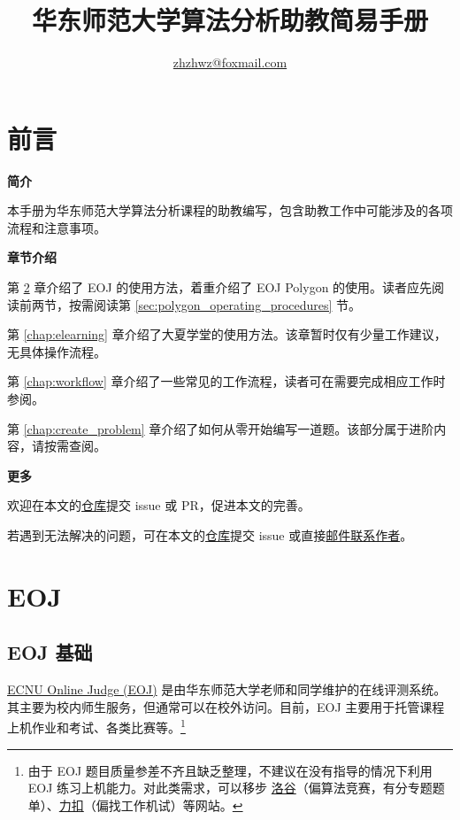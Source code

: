 \documentclass[oneside]{book}
\title{华东师范大学算法分析助教简易手册}
\author{\href{mailto:zhzhwz@foxmail.com}{zhzhwz@foxmail.com}}
\begin{document}
\frontmatter

\maketitle

\chapter{前言}

\noindent \textbf{简介}

本手册为华东师范大学算法分析课程的助教编写，包含助教工作中可能涉及的各项流程和注意事项。

\bigbreak

\noindent \textbf{章节介绍}

第 \ref{chap:eoj} 章介绍了 EOJ 的使用方法，着重介绍了 EOJ Polygon 的使用。读者应先阅读前两节，按需阅读第 \ref{sec:polygon_operating_procedures} 节。

第 \ref{chap:elearning} 章介绍了大夏学堂的使用方法。该章暂时仅有少量工作建议，无具体操作流程。

第 \ref{chap:workflow} 章介绍了一些常见的工作流程，读者可在需要完成相应工作时参阅。

第 \ref{chap:create_problem} 章介绍了如何从零开始编写一道题。该部分属于进阶内容，请按需查阅。

\bigbreak

\noindent \textbf{更多}

欢迎在本文的\href{https://github.com/zhzhwz/AlgorithmTAManual}{仓库}提交 issue 或 PR，促进本文的完善。

若遇到无法解决的问题，可在本文的\href{https://github.com/zhzhwz/AlgorithmTAManual}{仓库}提交 issue 或直接\href{mailto:zhzhwz@foxmail.com}{邮件联系作者}。 

\tableofcontents

\mainmatter

\chapter{EOJ}

\label{chap:eoj}

\section{EOJ 基础}

\label{sec:eoj_basics}

\href{https://acm.ecnu.edu.cn/}{ECNU Online Judge (EOJ)} 是由华东师范大学老师和同学维护的在线评测系统。其主要为校内师生服务，但通常可以在校外访问。目前，EOJ 主要用于托管课程上机作业和考试、各类比赛等。\footnote{由于 EOJ 题目质量参差不齐且缺乏整理，不建议在没有指导的情况下利用 EOJ 练习上机能力。对此类需求，可以移步 \href{https://www.luogu.com.cn/}{洛谷}（偏算法竞赛，有分专题题单）、\href{https://leetcode.cn/}{力扣}（偏找工作机试）等网站。}
\end{document}

